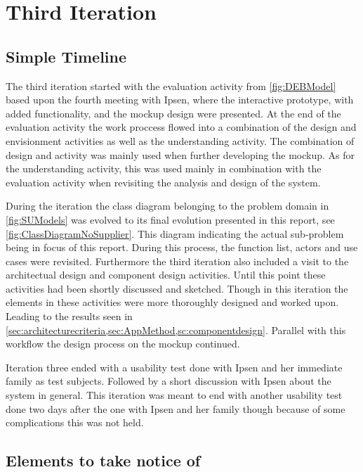 \section{Third Iteration}
\subsection{Simple Timeline}\label{sec:3Iteration-timeline}
The third iteration started with the evaluation activity from \cref{fig:DEBModel} based upon the fourth meeting with Ipsen, where the interactive prototype, with added functionality, and the mockup design were presented.
At the end of the evaluation activity the work proccess flowed into a combination of the design and envisionment activities as well as the understanding activity.
The combination of design and activity was mainly used when further developing the mockup.
As for the understanding activity, this was used mainly in combination with the evaluation activity when revisiting the analysis and design of the system.

During the iteration the class diagram belonging to the problem domain in \cref{fig:SUModels} was evolved to its final evolution presented in this report, see \cref{fig:ClassDiagramNoSupplier}.
This diagram indicating the actual sub-problem being in focus of this report.
During this process, the function list, actors and use cases were revisited.
Furthermore the third iteration also included a visit to the architectual design and component design activities.
Until this point these activities had been shortly discussed and sketched.
Though in this iteration the elements in these activities were more thoroughly designed and worked upon.
Leading to the results seen in \cref{sec:architecturecriteria,sec:AppMethod,sc:componentdesign}.
Parallel with this workflow the design process on the mockup continued.

Iteration three ended with a usability test done with Ipsen and her immediate family as test subjects.
Followed by a short discussion with Ipsen about the system in general.
This iteration was meant to end with another usability test done two days after the one with Ipsen and her family though because of some complications this was not held.

\subsection{Elements to take notice of}
